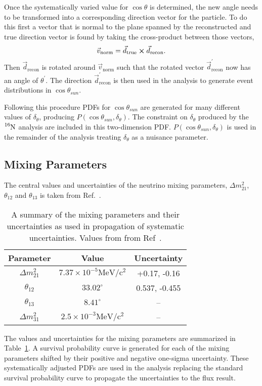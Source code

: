Once the systematically varied value for $\cos\theta$ is determined, the new angle
needs to be transformed into a corresponding direction vector for the particle.
To do this first a vector that is normal to the plane spanned by the reconstructed
and true direction vector is found by taking the cross-product between those vectors,
\begin{equation}
    \vec{v}_{\mathrm{norm}} = \vec{d}_{\mathrm{true}} \cross \vec{d}_{\mathrm{recon}}\text{.}
\end{equation}
Then $\vec{d}_{\mathrm{recon}}$ is rotated around $\vec{v}_{\mathrm{norm}}$
such that the rotated vector $\vec{d}^{\prime}_{\mathrm{recon}}$ now has an angle
of $\theta^{\prime}$.
The direction $\vec{d}^{\prime}_{\mathrm{recon}}$ is then used in the
analysis to generate event distributions in $\cos\theta_{sun}$.

Following this procedure PDFs for $\cos\theta_{sun}$ are generated for many different
values of $\delta_{\theta}$, producing $P(\cos\theta_{sun}, \delta_{\theta})$.
The constraint on $\delta_{\theta}$ produced by the $\ce{^{16}N}$ analysis
are included in this two-dimension PDF\@.
$P(\cos\theta_{sun}, \delta_{\theta})$ is used in the remainder of the analysis
treating $\delta_{\theta}$ as a nuisance parameter.

\subsection{Mixing Parameters}
The central values and uncertainties of the neutrino mixing parameters, $\Delta
m^{2}_{21}$, $\theta_{12}$ and $\theta_{13}$ is taken from Ref.~\citep{pdg_globalfit}.
\begin{table}
    \centering
    \begin{tabular}{c | c | c}
        Parameter & Value & Uncertainty\\
        \hline
        $\Delta m^{2}_{21}$ & $7.37\times10^{-5} \mathrm{MeV}/\mathrm{c}^{2}$ & +0.17, -0.16\\
        $\theta_{12}$ & $33.02^{\circ}$ & 0.537, -0.455 \\
        $\theta_{13}$ & $8.41^{\circ}$ & -- \\
        $\Delta m^{2}_{31}$ & $2.5\times10^{-3}\mathrm{MeV}/\mathrm{c}^{2}$ & -- \\
    \end{tabular}
    \caption{A summary of the mixing parameters and their uncertainties as used in 
    propagation of systematic uncertainties. Values from from Ref~\citep{pdg_globalfit}.}
\label{tbl:mixing_values}
\end{table}
The values and uncertainties for the mixing parameters
are summarized in Table~\ref{tbl:mixing_values}.
A survival probability curve is generated for each of the mixing parameters
shifted by their positive and negative one-sigma uncertainty.
These systematically adjusted PDFs are used in the analysis replacing the
standard survival probability curve to propagate the uncertainties to the
flux result.
